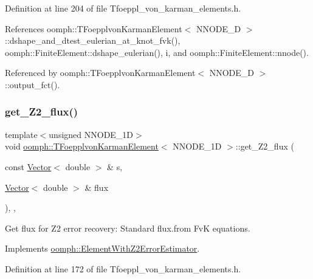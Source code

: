 Definition at line 204 of file Tfoeppl\+\_\+von\+\_\+karman\+\_\+elements.\+h.



References oomph\+::\+T\+Foepplvon\+Karman\+Element$<$ N\+N\+O\+D\+E\+\_\+D $>$\+::dshape\+\_\+and\+\_\+dtest\+\_\+eulerian\+\_\+at\+\_\+knot\+\_\+fvk(), oomph\+::\+Finite\+Element\+::dshape\+\_\+eulerian(), i, and oomph\+::\+Finite\+Element\+::nnode().



Referenced by oomph\+::\+T\+Foepplvon\+Karman\+Element$<$ N\+N\+O\+D\+E\+\_\+D $>$\+::output\+\_\+fct().

\mbox{\label{classoomph_1_1TFoepplvonKarmanElement_abb5ccf3f6067b81ddecd73c352534ef9}} 
\subsubsection{\texorpdfstring{get\+\_\+\+Z2\+\_\+flux()}{get\_Z2\_flux()}}
{\footnotesize\ttfamily template$<$unsigned N\+N\+O\+D\+E\+\_\+1D$>$ \\
void \hyperlink{classoomph_1_1TFoepplvonKarmanElement}{oomph\+::\+T\+Foepplvon\+Karman\+Element}$<$ N\+N\+O\+D\+E\+\_\+1D $>$\+::get\+\_\+\+Z2\+\_\+flux (\begin{DoxyParamCaption}\item[{const \hyperlink{classoomph_1_1Vector}{Vector}$<$ double $>$ \&}]{s,  }\item[{\hyperlink{classoomph_1_1Vector}{Vector}$<$ double $>$ \&}]{flux }\end{DoxyParamCaption})\hspace{0.3cm}{\ttfamily [inline]}, {\ttfamily [protected]}, {\ttfamily [virtual]}}



Get \textquotesingle{}flux\textquotesingle{} for Z2 error recovery\+: Standard flux.\+from FvK equations. 



Implements \hyperlink{classoomph_1_1ElementWithZ2ErrorEstimator_a5688ff5f546d81771cabad82ca5a7556}{oomph\+::\+Element\+With\+Z2\+Error\+Estimator}.



Definition at line 172 of file Tfoeppl\+\_\+von\+\_\+karman\+\_\+elements.\+h.



